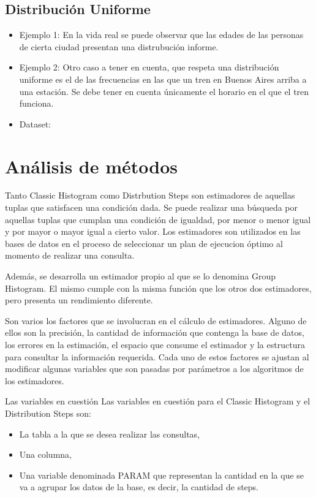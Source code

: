 \documentclass[10pt, a4paper,english,spanish,hidelinks]{article}
\begin{document}
\subsection{Distribución Uniforme}
\begin{itemize}
\item Ejemplo 1: En la vida real se puede observar que las edades de las personas de cierta ciudad presentan una distrubución informe. 

\item Ejemplo 2: Otro caso a tener en cuenta, que respeta una distribución uniforme es el de las frecuencias en las que un tren en Buenos Aires arriba a una estación. Se debe tener en cuenta únicamente el horario en el que el tren funciona. 

\item Dataset:

\end{itemize}

\newpage
\section{Análisis de métodos}
Tanto Classic Histogram como Distrbution Steps son estimadores de aquellas tuplas que satisfacen una condición dada. Se puede realizar una búsqueda por aquellas tuplas que cumplan una condición de igualdad, por menor o menor igual y por mayor o mayor igual a cierto valor. Los estimadores son utilizados en las bases de datos en el proceso de seleccionar un plan de ejecucion óptimo 
al momento de realizar una consulta.

Además, se desarrolla un estimador propio al que se lo denomina Group Histogram. El mismo cumple con la misma función que los otros dos estimadores, pero presenta un rendimiento diferente. 

Son varios los factores que se involucran en el cálculo de estimadores. Alguno de ellos
son la precisión, la cantidad de información que contenga la base de datos, los errores
en la estimación, el espacio que consume el estimador y la estructura para consultar la
información requerida. Cada uno de estos factores se ajustan al modificar algunas variables
que son pasadas por parámetros a los algoritmos de los estimadores.

Las variables en cuestión Las variables en cuestión para el Classic Histogram y el Distribution Steps son:
\begin{itemize}
\item La tabla a la que se desea realizar las consultas,
\item Una columna,
\item Una variable denominada PARAM que representan la cantidad en la que se va a agrupar
los datos de la base, es decir, la cantidad de steps.
\end{itemize}
\end{document}
